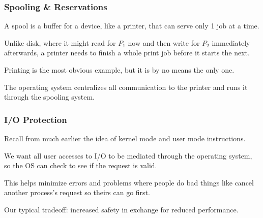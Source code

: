 \begin{frame}
\frametitle{Spooling \& Reservations}

A \alert{spool} is a buffer for a device, like a printer, that can serve only 1 job at a time. 

Unlike disk, where it might read for $P_{1}$ now and then write for $P_{2}$ immediately afterwards, a printer needs to finish a whole print job before it starts the next. 

Printing is the most obvious example, but it is by no means the only one. 

The operating system centralizes all communication to the printer and runs it through the spooling system. 


\end{frame}



\begin{frame}
\frametitle{I/O Protection}

Recall from much earlier the idea of kernel mode and user mode instructions. 

We want all user accesses to I/O to be mediated through the operating system, so the OS can check to see if the request is valid. 

This helps minimize errors and problems where people do bad things like cancel another process's request so theirs can go first. 

Our typical tradeoff: increased safety in exchange for reduced performance.

\end{frame}



